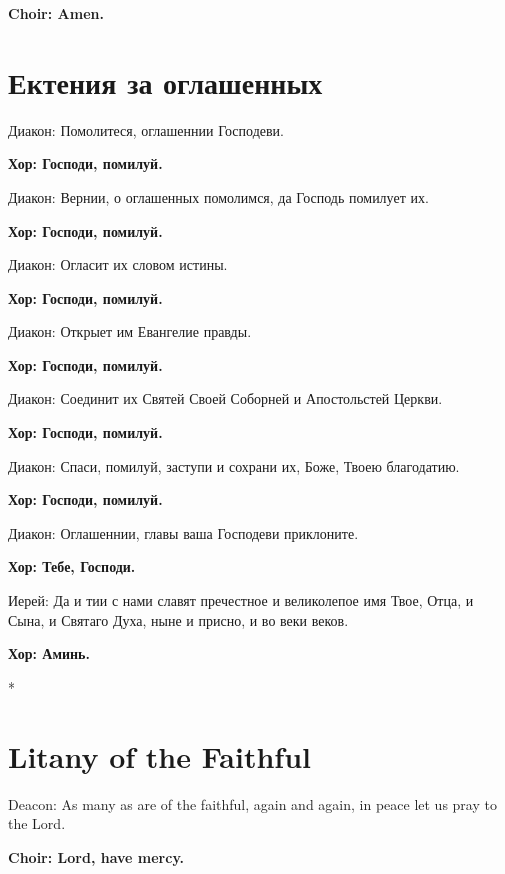 \documentclass[12pt,a4paper,titlepage]{report}
\begin{document}
\begin{paracol}[1]{2}
  \textbf{Choir: Amen.}

  \switchcolumn[1]

  \section*{Ектения за оглашенных}

  Диакон: Помолитеся, оглашеннии Господеви.

  \textbf{Хор: Господи, помилуй.}

  Диакон: Вернии, о оглашенных помолимся, да Господь помилует их.

  \textbf{Хор: Господи, помилуй.}

  Диакон: Огласит их словом истины.

  \textbf{Хор: Господи, помилуй.}

  Диакон: Открыет им Евангелие правды.

  \textbf{Хор: Господи, помилуй.}

  Диакон: Соединит их Святей Своей Соборней и Апостольстей Церкви.

  \textbf{Хор: Господи, помилуй.}

  Диакон: Спаси, помилуй, заступи и сохрани их, Боже, Твоею благодатию.

  \textbf{Хор: Господи, помилуй.}

  Диакон: Оглашеннии, главы ваша Господеви приклоните.

  \textbf{Хор: Тебе, Господи.}

  Иерей: Да и тии с нами славят пречестное и великолепое имя Твое, Отца, и Сына, и Святаго Духа, ныне и присно, и во веки веков.

  \textbf{Хор: Аминь.}

  \switchcolumn[0]*

  \section*{Litany of the Faithful}

  Deacon: As many as are of the faithful, again and again, in peace let us pray to the Lord.

  \textbf{Choir: Lord, have mercy.}


\end{paracol}
\end{document}
